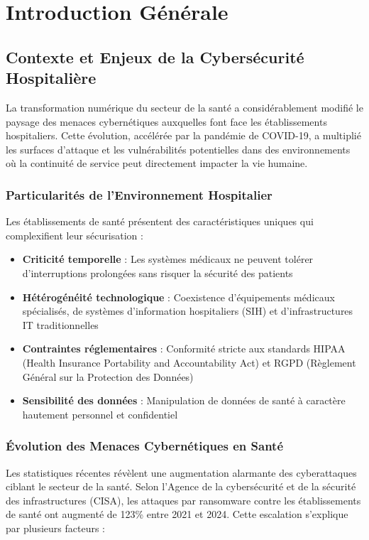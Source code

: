 \chapter{Introduction Générale}

\section{Contexte et Enjeux de la Cybersécurité Hospitalière}

La transformation numérique du secteur de la santé a considérablement modifié le paysage des menaces cybernétiques auxquelles font face les établissements hospitaliers. Cette évolution, accélérée par la pandémie de COVID-19, a multiplié les surfaces d'attaque et les vulnérabilités potentielles dans des environnements où la continuité de service peut directement impacter la vie humaine.

\subsection{Particularités de l'Environnement Hospitalier}

Les établissements de santé présentent des caractéristiques uniques qui complexifient leur sécurisation :

\begin{itemize}
    \item \textbf{Criticité temporelle} : Les systèmes médicaux ne peuvent tolérer d'interruptions prolongées sans risquer la sécurité des patients
    \item \textbf{Hétérogénéité technologique} : Coexistence d'équipements médicaux spécialisés, de systèmes d'information hospitaliers (SIH) et d'infrastructures IT traditionnelles
    \item \textbf{Contraintes réglementaires} : Conformité stricte aux standards HIPAA (Health Insurance Portability and Accountability Act) et RGPD (Règlement Général sur la Protection des Données)
    \item \textbf{Sensibilité des données} : Manipulation de données de santé à caractère hautement personnel et confidentiel
\end{itemize}

\subsection{Évolution des Menaces Cybernétiques en Santé}

Les statistiques récentes révèlent une augmentation alarmante des cyberattaques ciblant le secteur de la santé. Selon l'Agence de la cybersécurité et de la sécurité des infrastructures (CISA), les attaques par ransomware contre les établissements de santé ont augmenté de 123\% entre 2021 et 2024. Cette escalation s'explique par plusieurs facteurs :

